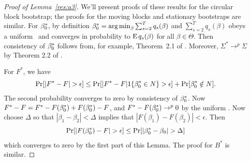\documentclass[12pt,fleqn]{article}
\begin{document}
\begin{proof}[Proof of Lemma~\ref{res:a3}]
  We'll present proofs of these results for the circular block
  bootstrap; the proofs for the moving blocks and stationary
  bootstraps are similar. For $\beta_0^*$, by definition $\beta_0^* =
  \operatorname*{arg\,min}_\beta \sum_{s=2}^T q_s(\beta)$ and $\sum_{s=2}^T q_s(\beta)$
  obeys a uniform \lln\ and converges in probability to $\operatorname{E}
  q_s(\beta)$ for all $\beta \in \Theta$. Then consistency of
  $\beta_0^*$ follows from, for example, Theorem~2.1 of \cite{NeM:94}.
  Moreover, $\Sigma^* \to^p \Sigma$ by Theorem 2.2 of
  \citet{JoD:00}.

  For $F^*$, we have
  \begin{equation*}
    \operatorname{Pr}[|F^* - F| > \epsilon] \leq
    \operatorname{Pr}[|F^* - F| 1\{\beta_0^* \in N\} > \epsilon] + \operatorname{Pr}[\beta_0^* \notin N].
  \end{equation*}
  The second probability converges to zero by consistency of
  $\beta_0^*$.  Now $F^* - F = F^* - F(\beta_0^*) + F(\beta_0^*) - F$,
  and $F^* - F(\beta_0^*) \to^p 0$ by the uniform \lln. Now choose
  $\Delta$ so that $|\beta_1 - \beta_2| < \Delta$ implies that
  $|F(\beta_1) - F(\beta_2) | < \epsilon$. Then
  \begin{equation*}
     \operatorname{Pr}[|F(\beta_0^*) - F | > \epsilon] \leq \operatorname{Pr}[|\beta_0^* - \beta_0| > \Delta]
  \end{equation*}
  which converges to zero by the first part of this Lemma. The proof
  for $B^*$ is similar.
\end{proof}


\end{document}
